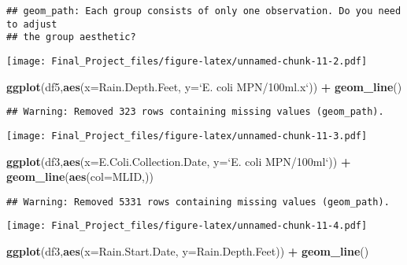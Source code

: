 \documentclass[
]{article}
\newenvironment{Shaded}{\begin{snugshade}}{\end{snugshade}}
\newcommand{\DataTypeTok}[1]{\textcolor[rgb]{0.13,0.29,0.53}{#1}}
\newcommand{\KeywordTok}[1]{\textcolor[rgb]{0.13,0.29,0.53}{\textbf{#1}}}
\newcommand{\NormalTok}[1]{#1}
\newcommand{\OperatorTok}[1]{\textcolor[rgb]{0.81,0.36,0.00}{\textbf{#1}}}
\newcommand{\StringTok}[1]{\textcolor[rgb]{0.31,0.60,0.02}{#1}}
\begin{document}
\begin{verbatim}
## geom_path: Each group consists of only one observation. Do you need to adjust
## the group aesthetic?
\end{verbatim}

\texttt{[image: Final\_Project\_files/figure-latex/unnamed-chunk-11-2.pdf]}

\begin{Shaded}
\begin{Highlighting}[]
\KeywordTok{ggplot}\NormalTok{(df5,}\KeywordTok{aes}\NormalTok{(}\DataTypeTok{x=}\NormalTok{Rain.Depth.Feet, }\DataTypeTok{y=}\StringTok{`}\DataTypeTok{E. coli MPN/100ml.x}\StringTok{`}\NormalTok{)) }\OperatorTok{+}
\StringTok{  }\KeywordTok{geom_line}\NormalTok{()}
\end{Highlighting}
\end{Shaded}

\begin{verbatim}
## Warning: Removed 323 rows containing missing values (geom_path).
\end{verbatim}

\texttt{[image: Final\_Project\_files/figure-latex/unnamed-chunk-11-3.pdf]}

\begin{Shaded}
\begin{Highlighting}[]
\KeywordTok{ggplot}\NormalTok{(df3,}\KeywordTok{aes}\NormalTok{(}\DataTypeTok{x=}\NormalTok{E.Coli.Collection.Date, }\DataTypeTok{y=}\StringTok{`}\DataTypeTok{E. coli MPN/100ml}\StringTok{`}\NormalTok{)) }\OperatorTok{+}
\StringTok{  }\KeywordTok{geom_line}\NormalTok{(}\KeywordTok{aes}\NormalTok{(}\DataTypeTok{col=}\NormalTok{MLID,))}
\end{Highlighting}
\end{Shaded}

\begin{verbatim}
## Warning: Removed 5331 rows containing missing values (geom_path).
\end{verbatim}

\texttt{[image: Final\_Project\_files/figure-latex/unnamed-chunk-11-4.pdf]}

\begin{Shaded}
\begin{Highlighting}[]
\KeywordTok{ggplot}\NormalTok{(df3,}\KeywordTok{aes}\NormalTok{(}\DataTypeTok{x=}\NormalTok{Rain.Start.Date, }\DataTypeTok{y=}\NormalTok{Rain.Depth.Feet)) }\OperatorTok{+}
\StringTok{  }\KeywordTok{geom_line}\NormalTok{()}
\end{Highlighting}
\end{Shaded}
\end{document}
